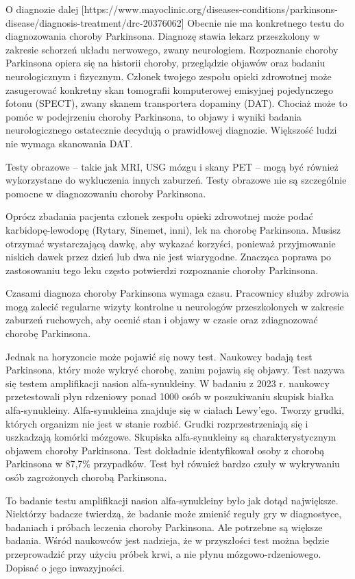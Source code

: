 O diagnozie dalej [https://www.mayoclinic.org/diseases-conditions/parkinsons-disease/diagnosis-treatment/drc-20376062]
Obecnie nie ma konkretnego testu do diagnozowania choroby Parkinsona.
Diagnozę stawia lekarz przeszkolony w zakresie schorzeń układu nerwowego, zwany neurologiem.
Rozpoznanie choroby Parkinsona opiera się na historii choroby, przeglądzie objawów oraz badaniu neurologicznym i fizycznym.
Członek twojego zespołu opieki zdrowotnej może zasugerować konkretny skan tomografii komputerowej emisyjnej pojedynczego fotonu (SPECT),
zwany skanem transportera dopaminy (DAT).
Chociaż może to pomóc w podejrzeniu choroby Parkinsona, to objawy i wyniki badania neurologicznego ostatecznie decydują o prawidłowej diagnozie.
Większość ludzi nie wymaga skanowania DAT.


Testy obrazowe – takie jak MRI, USG mózgu i skany PET – mogą być również wykorzystane do wykluczenia innych zaburzeń.
Testy obrazowe nie są szczególnie pomocne w diagnozowaniu choroby Parkinsona.

Oprócz zbadania pacjenta członek zespołu opieki zdrowotnej może podać karbidopę-lewodopę (Rytary, Sinemet, inni), lek na chorobę Parkinsona.
Musisz otrzymać wystarczającą dawkę, aby wykazać korzyści, ponieważ przyjmowanie niskich dawek przez dzień lub dwa nie jest wiarygodne.
Znacząca poprawa po zastosowaniu tego leku często potwierdzi rozpoznanie choroby Parkinsona.

Czasami diagnoza choroby Parkinsona wymaga czasu.
Pracownicy służby zdrowia mogą zalecić regularne wizyty kontrolne u neurologów przeszkolonych w zakresie zaburzeń ruchowych,
aby ocenić stan i objawy w czasie oraz zdiagnozować chorobę Parkinsona.

Jednak na horyzoncie może pojawić się nowy test.
Naukowcy badają test Parkinsona, który może wykryć chorobę, zanim pojawią się objawy.
Test nazywa się testem amplifikacji nasion alfa-synukleiny.
W badaniu z 2023 r. naukowcy przetestowali płyn rdzeniowy ponad 1000 osób w poszukiwaniu skupisk białka alfa-synukleiny.
Alfa-synukleina znajduje się w ciałach Lewy'ego.
Tworzy grudki, których organizm nie jest w stanie rozbić.
Grudki rozprzestrzeniają się i uszkadzają komórki mózgowe.
Skupiska alfa-synukleiny są charakterystycznym objawem choroby Parkinsona.
Test dokładnie identyfikował osoby z chorobą Parkinsona w 87,7\% przypadków.
Test był również bardzo czuły w wykrywaniu osób zagrożonych chorobą Parkinsona.

To badanie testu amplifikacji nasion alfa-synukleiny było jak dotąd największe.
Niektórzy badacze twierdzą, że badanie może zmienić reguły gry w diagnostyce, badaniach i próbach leczenia choroby Parkinsona.
Ale potrzebne są większe badania.
Wśród naukowców jest nadzieja, że w przyszłości test można będzie przeprowadzić przy użyciu próbek krwi, a nie płynu mózgowo-rdzeniowego.
Dopisać o jego inwazyjności.


